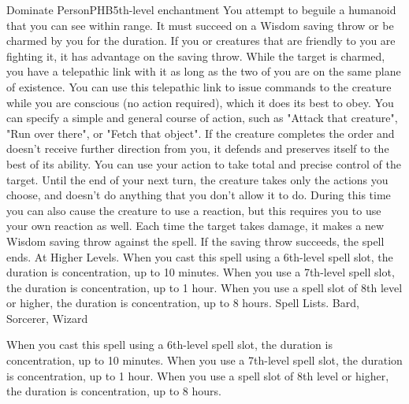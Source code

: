 \begin{spell}{Dominate Person}{PHB}{5th-level enchantment}
{
}
You attempt to beguile a humanoid that you can see within range. It must succeed on a Wisdom saving throw or be charmed by you for the duration. If you or creatures that are friendly to you are fighting it, it has advantage on the saving throw.
While the target is charmed, you have a telepathic link with it as long as the two of you are on the same plane of existence. You can use this telepathic link to issue commands to the creature while you are conscious (no action required), which it does its best to obey. You can specify a simple and general course of action, such as "Attack that creature", "Run over there", or "Fetch that object". If the creature completes the order and doesn’t receive further direction from you, it defends and preserves itself to the best of its ability.
You can use your action to take total and precise control of the target. Until the end of your next turn, the creature takes only the actions you choose, and doesn’t do anything that you don’t allow it to do. During this time you can also cause the creature to use a reaction, but this requires you to use your own reaction as well.
Each time the target takes damage, it makes a new Wisdom saving throw against the spell. If the saving throw succeeds, the spell ends.
At Higher Levels. When you cast this spell using a 6th-level spell slot, the duration is concentration, up to 10 minutes. When you use a 7th-level spell slot, the duration is concentration, up to 1 hour. When you use a spell slot of 8th level or higher, the duration is concentration, up to 8 hours.
Spell Lists. Bard, Sorcerer, Wizard

 When you cast this spell using a 6th-level spell slot, the duration is concentration, up to 10 minutes. When you use a 7th-level spell slot, the duration is concentration, up to 1 hour. When you use a spell slot of 8th level or higher, the duration is concentration, up to 8 hours.
\end{spell}

